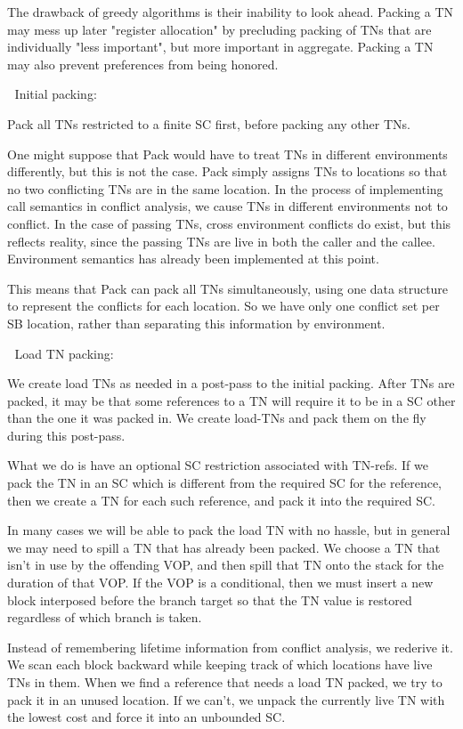 The drawback of greedy algorithms is their inability to look ahead.  Packing a
TN may mess up later "register allocation" by precluding packing of TNs that
are individually "less important", but more important in aggregate.  Packing a
TN may also prevent preferences from being honored.



Initial packing:


Pack all TNs restricted to a finite SC first, before packing any other TNs.

One might suppose that Pack would have to treat TNs in different environments
differently, but this is not the case.  Pack simply assigns TNs to locations so
that no two conflicting TNs are in the same location.  In the process of
implementing call semantics in conflict analysis, we cause TNs in different
environments not to conflict.  In the case of passing TNs, cross environment
conflicts do exist, but this reflects reality, since the passing TNs are
live in both the caller and the callee.  Environment semantics has already been
implemented at this point.

This means that Pack can pack all TNs simultaneously, using one data structure
to represent the conflicts for each location.  So we have only one conflict set
per SB location, rather than separating this information by environment.


Load TN packing:

We create load TNs as needed in a post-pass to the initial packing.  After TNs
are packed, it may be that some references to a TN will require it to be in a
SC other than the one it was packed in.  We create load-TNs and pack them on
the fly during this post-pass.  

What we do is have an optional SC restriction associated with TN-refs.  If we
pack the TN in an SC which is different from the required SC for the reference,
then we create a TN for each such reference, and pack it into the required SC.

In many cases we will be able to pack the load TN with no hassle, but in
general we may need to spill a TN that has already been packed.  We choose a
TN that isn't in use by the offending VOP, and then spill that TN onto the
stack for the duration of that VOP.  If the VOP is a conditional, then we must
insert a new block interposed before the branch target so that the TN
value is restored regardless of which branch is taken.

Instead of remembering lifetime information from conflict analysis, we rederive
it.  We scan each block backward while keeping track of which locations have
live TNs in them.  When we find a reference that needs a load TN packed, we try
to pack it in an unused location.  If we can't, we unpack the currently live TN
with the lowest cost and force it into an unbounded SC.

